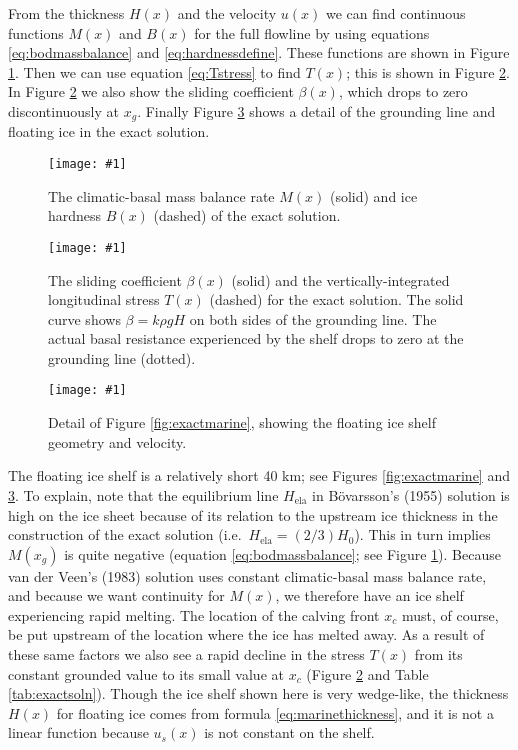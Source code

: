 \documentclass[twocolumn]{igs}
\renewcommand{\dh}{\fontencoding{T1}\selectfont{\symbol{240}}}
\newcommand{\onecol}[1]{\texttt{[image: \#1]}}
\newcommand{\bod}{B\"o\dh varsson\xspace}
\newcommand{\Hela}{H_{\text{ela}}}
\begin{document}
From the thickness $H(x)$ and the velocity $u(x)$ we can find continuous functions $M(x)$ and $B(x)$ for the full  flowline by using equations \eqref{eq:bodmassbalance} and \eqref{eq:hardnessdefine}.  These functions are shown in Figure \ref{fig:exactMB}.  Then we can use equation \eqref{eq:Tstress} to find $T(x)$; this is shown in Figure \ref{fig:exactbetaT}.  In Figure \ref{fig:exactbetaT} we also show the sliding coefficient $\beta(x)$, which drops to zero discontinuously at $x_g$.  Finally Figure \ref{fig:em-detail} shows a detail of the grounding line and floating ice in the exact solution.

\begin{figure}[ht]
\onecol{em-M-B}
\caption{The climatic-basal mass balance rate $M(x)$ (solid) and ice hardness $B(x)$ (dashed) of the exact solution.} \label{fig:exactMB}
\end{figure}

\begin{figure}[ht]
\onecol{em-beta-T}
\caption{The sliding coefficient $\beta(x)$ (solid) and the vertically-integrated longitudinal stress $T(x)$ (dashed) for the exact solution.  The solid curve shows $\beta = k \rho g H$ on both sides of the grounding line.  The actual basal resistance experienced by the shelf drops to zero at the grounding line (dotted).} \label{fig:exactbetaT}
\end{figure}

\begin{figure}[ht]
\onecol{em-geometry-detail}
\caption{Detail of Figure \ref{fig:exactmarine}, showing the floating ice shelf geometry and velocity.} \label{fig:em-detail}
\end{figure}

The floating ice shelf is a relatively short 40 km; see Figures \ref{fig:exactmarine} and \ref{fig:em-detail}.  To explain, note that the equilibrium line $\Hela$ in \bod's (1955) solution is high on the ice sheet because of its relation to the upstream ice thickness in the construction of the exact solution (i.e.~$\Hela = (2/3) H_0$).  This in turn implies $M(x_g)$ is quite negative (equation \eqref{eq:bodmassbalance}; see Figure \ref{fig:exactMB}).  Because van der Veen's (1983) solution uses constant climatic-basal mass balance rate, and because we want continuity for $M(x)$, we therefore have an ice shelf experiencing rapid melting.  The location of the calving front $x_c$ must, of course, be put upstream of the location where the ice has melted away.  As a result of these same factors we also see a rapid decline in the stress $T(x)$ from its constant grounded value to its small value at $x_c$ (Figure \ref{fig:exactbetaT} and Table \ref{tab:exactsoln}).  Though the ice shelf shown here is very wedge-like, the thickness $H(x)$ for floating ice comes from formula \eqref{eq:marinethickness}, and it is not a linear function because $u_s(x)$ is not constant on the shelf.
\end{document}

